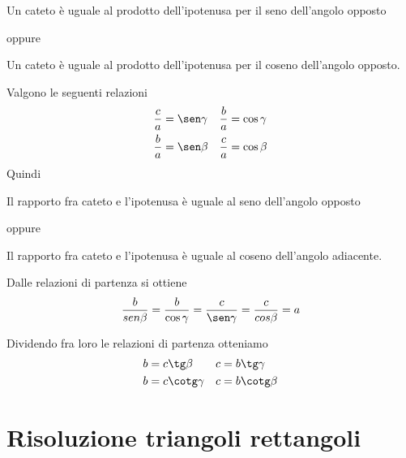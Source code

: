 Un cateto è uguale  al prodotto dell'ipotenusa per il seno dell'angolo opposto

\noindent oppure

Un cateto è uguale al prodotto dell'ipotenusa per il coseno dell'angolo opposto.

\noindent Valgono le seguenti relazioni
\begin{align*}
\dfrac{c}{a}&=\sen\gamma&\dfrac{b}{a}&=\cos\gamma\\
\dfrac{b}{a}&=\sen\beta&\dfrac{c}{a}&=\cos\beta
\end{align*}
Quindi

Il rapporto fra  cateto e l'ipotenusa è uguale al seno dell'angolo opposto

\noindent oppure

Il rapporto fra  cateto e l'ipotenusa è uguale al coseno dell'angolo adiacente.

\noindent Dalle relazioni di partenza si ottiene
\[\dfrac{b}{sen\beta}=\dfrac{b}{\cos\gamma}=\dfrac{c}{\sen\gamma}=\dfrac{c}{cos\beta}=a \]


Dividendo fra loro le relazioni di partenza otteniamo
\begin{align*}
b&=c\tg\beta&c&=b\tg\gamma\\
b&=c\cotg\gamma&c&=b\cotg\beta
\end{align*}
\section{Risoluzione triangoli rettangoli}
